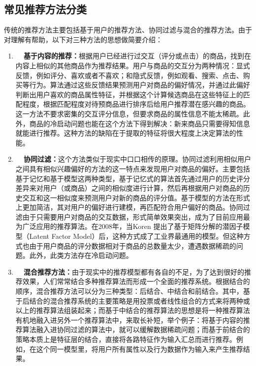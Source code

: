 \subsection{常见推荐方法分类}
传统的推荐方法主要包括基于用户的推荐方法、协同过滤与混合的推荐方法。由于对理解有帮助，以下对三种方法的思想做简要介绍：
\begin{enumerate}
    \item \textbf{~~基于内容的推荐：}根据用户已经进行过交互（评分或点击）的商品，找到在内容上相似的其他商品作为推荐结果。用户与商品的交互分为两种情况：显式反馈，例如评分、喜欢或者不喜欢；和隐式反馈，例如观看、搜索、点击、购买等行为。算法通过这些反馈结果预测用户对商品的偏好情况，并通过此偏好判断出用户喜欢的商品属性特征，并根据这个计算候选商品在这些特征上的匹配程度，根据匹配程度对待预商品进行排序后给用户推荐潜在感兴趣的商品。这一方法不要求密集的交互评分信息，但要求商品的属性信息不能太稀疏。此外，商品的冷启动问题也能在这个方法下得到解决：新来商品只需要得知信息就能进行推荐。这种方法的缺陷在于提取的特征将很大程度上决定算法的性能。

    \item \textbf{~~协同过滤：}这个方法类似于现实中口口相传的原理。协同过滤利用相似用户之间具有相似兴趣偏好的方法的这一特点来发现用户对商品的偏好。主要包括基于记忆和基于模型这两种类型，基于记忆式的算法首先通过用户的历史评分差异来对用户（或商品）之间的相似度进行计算，然后再根据用户对商品的历史交互和这一相似度来预测用户对新的商品的评分值。基于模型的方法在形式上更加简洁，其对用户的偏好进行建模，再匹配符合用户偏好的商品。协同过滤由于只需要用户对商品的交互数据，形式简单效果突出，成为了目前应用最为广泛应用的推荐算法。在2008年，当Koren 提出了基于矩阵分解的潜因子模型（Latent Factor Model）后，这种方式成了工业界最通用的模型。但这种方式也由于用户商品的评分数据相对于商品的总数量太少，遭遇数据稀疏的问题。此外，此类方法存在冷启动问题。

    \item \textbf{~~混合推荐方法：}由于现实中的推荐模型都有各自的不足，为了达到很好的推荐效果，人们常常结合多种推荐算法而形成一个全面的推荐系统。根据结合的顺序，混合推荐方法可以分为三种类型：后结合、中结合和前结合。其中，基于后结合的混合推荐系统的主要策略是用投票或者线性组合的方式来将两种或以上的推荐算法组装起来；而基于中结合的推荐算法的思想是将一种推荐算法有机地融入进另外一个推荐算法中，来取长补短，举个例子：将基于内容的推荐算法融入进协同过滤的算法中，就可以缓解数据稀疏问题；而基于前结合的策略本质上是特征层的结合，直接将各路特征作为输入汇总而进行推荐。例如，在这个同一模型里，将用户所有属性以及行为数据作为输入来产生推荐结果。
\end{enumerate}

